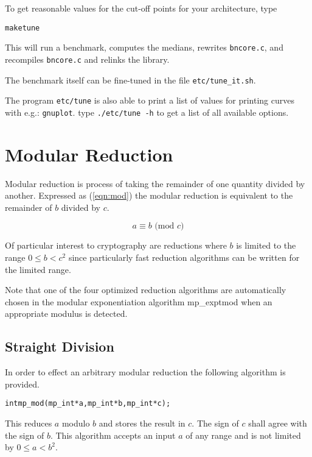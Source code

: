 \documentclass[synpaper]{book}
\begin{document}
To get reasonable values for the cut-off points for your architecture, type

\begin{alltt}
make tune
\end{alltt}

This will run a benchmark, computes the medians, rewrites \texttt{bncore.c}, and recompiles \texttt{bncore.c} and relinks the library.

The benchmark itself can be fine-tuned in the file \texttt{etc/tune\_it.sh}.

The program \texttt{etc/tune} is also able to print a list of values for printing curves with e.g.: \texttt{gnuplot}. type \texttt{./etc/tune -h} to get a list of all available options.

\chapter{Modular Reduction}

Modular reduction is process of taking the remainder of one quantity divided by another.  Expressed
as (\ref{eqn:mod}) the modular reduction is equivalent to the remainder of $b$ divided by $c$.

\begin{equation}
a \equiv b \mbox{ (mod }c\mbox{)}
\label{eqn:mod}
\end{equation}

Of particular interest to cryptography are reductions where $b$ is limited to the range $0 \le b < c^2$ since particularly
fast reduction algorithms can be written for the limited range.

Note that one of the four optimized reduction algorithms are automatically chosen in the modular exponentiation
algorithm mp\_exptmod when an appropriate modulus is detected.

\section{Straight Division}
In order to effect an arbitrary modular reduction the following algorithm is provided.

\begin{alltt}
int mp_mod(mp_int *a, mp_int *b, mp_int *c);
\end{alltt}

This reduces $a$ modulo $b$ and stores the result in $c$.  The sign of $c$ shall agree with the sign
of $b$.  This algorithm accepts an input $a$ of any range and is not limited by $0 \le a < b^2$.
\end{document}
